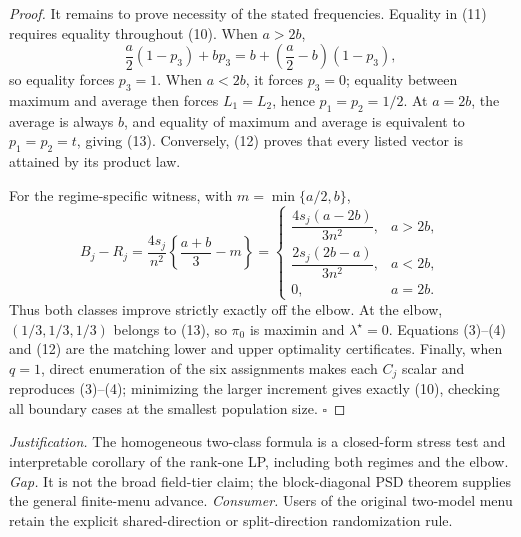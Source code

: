 \documentclass{article}
\begin{document}
\begin{proof}
It remains to prove necessity of the stated frequencies.  Equality in (11) requires equality throughout (10).  When \(a>2b\),
\[
\frac a2(1-p_3)+bp_3
=b+\left(\frac a2-b\right)(1-p_3),
\]
so equality forces \(p_3=1\).  When \(a<2b\), it forces \(p_3=0\); equality between maximum and average then forces \(L_1=L_2\), hence \(p_1=p_2=1/2\).  At \(a=2b\), the average is always \(b\), and equality of maximum and average is equivalent to \(p_1=p_2=t\), giving (13).  Conversely, (12) proves that every listed vector is attained by its product law.

For the regime-specific witness, with \(m=\min\{a/2,b\}\),
\[
B_j-R_j
=\frac{4s_j}{n^2}\left\{\frac{a+b}{3}-m\right\}
=\begin{cases}
\dfrac{4s_j(a-2b)}{3n^2},&a>2b,\\[6pt]
\dfrac{2s_j(2b-a)}{3n^2},&a<2b,\\[6pt]
0,&a=2b.
\end{cases} \tag{14}
\]
Thus both classes improve strictly exactly off the elbow.  At the elbow, \((1/3,1/3,1/3)\) belongs to (13), so \(\pi_0\) is maximin and \(\lambda^\star=0\).  Equations (3)--(4) and (12) are the matching lower and upper optimality certificates.  Finally, when \(q=1\), direct enumeration of the six assignments makes each \(C_j\) scalar and reproduces (3)--(4); minimizing the larger increment gives exactly (10), checking all boundary cases at the smallest population size. \(\square\)
\end{proof}
\par\smallskip\noindent \textit{Justification.} The homogeneous two-class formula is a closed-form stress test and interpretable corollary of the rank-one LP, including both regimes and the elbow. \textit{Gap.} It is not the broad field-tier claim; the block-diagonal PSD theorem supplies the general finite-menu advance. \textit{Consumer.} Users of the original two-model menu retain the explicit shared-direction or split-direction randomization rule.
\end{document}
